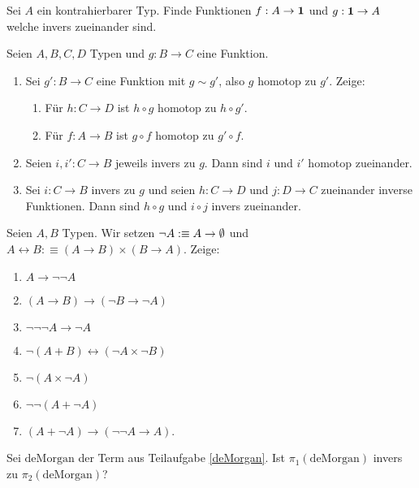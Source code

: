 \documentclass{uebung}
\begin{document}

\begin{exercise}
  Sei $A$ ein kontrahierbarer Typ.
  Finde Funktionen $f:A\to\mathbf{1}$ und $g:\mathbf{1}\to A$ welche invers zueinander sind.
\end{exercise}

\begin{exercise}
  Seien $A,B,C,D$ Typen und $g:B\to C$ eine Funktion.
  \begin{enumerate}
    \item Sei $g':B\to C$ eine Funktion mit $g\sim g'$, also $g$ homotop zu $g'$.
    Zeige:
    \begin{enumerate}
      \item Für $h:C\to D$ ist $h\circ g$ homotop zu $h\circ g'$.
      \item Für $f:A\to B$ ist $g\circ f$ homotop zu $g'\circ f$.
    \end{enumerate}
  \item Seien $i,i':C\to B$ jeweils invers zu $g$.
    Dann sind $i$ und $i'$ homotop zueinander.
  \item Sei $i:C\to B$ invers zu $g$ und seien $h:C\to D$ und $j:D\to C$ zueinander inverse Funktionen.
    Dann sind $h\circ g$ und $i\circ j$ invers zueinander.
  \end{enumerate}
\end{exercise}

\begin{exercise}
  Seien $A,B$ Typen.
  Wir setzen $\neg A:\equiv A\to\emptyset$ und $A\leftrightarrow B:\equiv (A\to B)\times (B\to A)$.
  Zeige:
  \begin{multicols}{2}
    \begin{enumerate}
      \item $A\to\neg\neg A$
      \item $(A\to B)\to(\neg B\to\neg A)$
      \item $\neg\neg\neg A\to\neg A$
      \item\label{deMorgan} $\neg(A+B) \leftrightarrow (\neg A\times \neg B)$
      \item $\neg(A\times \neg A)$
      \item $\neg\neg(A+\neg A)$
    \item $(A+\neg A)\to (\neg\neg A\to A)$.
    \end{enumerate}
  \end{multicols}
  Sei $\mathrm{deMorgan}$ der Term aus Teilaufgabe \ref{deMorgan}. Ist $\pi_1(\mathrm{deMorgan})$ invers zu $\pi_2(\mathrm{deMorgan})$?
\end{exercise}
\end{document}
